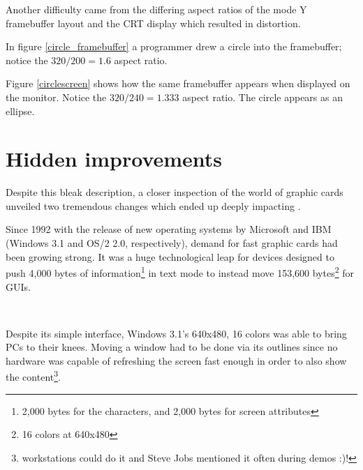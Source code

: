  \label{vga_ratio}
\par
\vspace{-10pt}
Another difficulty came from the differing aspect ratios of the mode Y framebuffer layout and the CRT display which resulted in distortion. \\
\par
\vspace{-10pt}
\par
In figure \ref{circle_framebuffer} a programmer drew a circle into the framebuffer; notice the $ 320/200 = 1.6 $ aspect ratio.\\
\par
{}
\par
Figure \ref{circlescreen} shows how the same framebuffer appears when displayed on the monitor. Notice the $ 320/240 = 1.333 $ aspect ratio. The circle appears as an ellipse.\\







\section{Hidden improvements}
Despite this bleak description, a closer inspection of the world of graphic cards unveiled two tremendous changes which ended up deeply impacting \doom. \\
\par
Since 1992 with the release of new operating systems by Microsoft and IBM (Windows 3.1 and OS/2 2.0, respectively), demand for fast graphic cards had been growing strong. It was a huge technological leap for devices designed to push 4,000 bytes of information\footnote{2,000 bytes for the characters, and 2,000 bytes for screen attributes} in text mode to instead move 153,600 bytes\footnote{16 colors at 640x480} for GUIs.

\\
\par 
Despite its simple interface, Windows 3.1's 640x480, 16 colors was able to bring PCs to their knees. Moving a window had to be done via its outlines since no hardware was capable of refreshing the screen fast enough in order to also show the content\footnote{\NeXT workstations could do it and Steve Jobs mentioned it often during demos :)!}.



